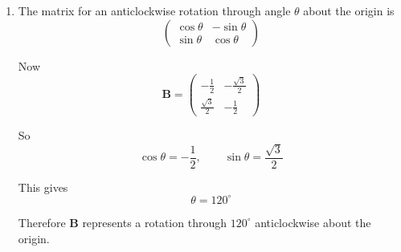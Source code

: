 \documentclass[leqno]{article}
\begin{document}
\begin{enumerate}[
  label=\textbf{\arabic*.},
  leftmargin=*,
  topsep=0pt,
  partopsep=0pt,
  parsep=0pt
]
\begin{djsSolution}
\begin{enumerate}[label=\textbf{(\roman*)}]
This gives the simultaneous equations
\begin{align*}
-\frac12x+\frac{\sqrt3}{2}y&=x\\
\frac{\sqrt3}{2}x+\frac12y&=y
\end{align*}

Multiply both equations by \(2\):
\begin{align*}
-x+\sqrt3\,y&=2x\\
\sqrt3\,x+y&=2y
\end{align*}

So
\begin{align*}
-3x+\sqrt3\,y&=0\\
\sqrt3\,x-y&=0
\end{align*}

From either equation:
\[
y=\sqrt3\,x
\]

So the mirror line is
\[
y=\sqrt3 x
\]

\item
The matrix for an anticlockwise rotation through angle \(\theta\) about the origin is
\[
\begin{pmatrix}
\cos\theta & -\sin\theta\\
\sin\theta & \cos\theta
\end{pmatrix}
\]

Now
\[
\mathbf{B}=
\begin{pmatrix}
-\frac12 & -\frac{\sqrt3}{2}\\[4pt]
\frac{\sqrt3}{2} & -\frac12
\end{pmatrix}
\]

So
\[
\cos\theta=-\frac12,\qquad \sin\theta=\frac{\sqrt3}{2}
\]

This gives
\[
\theta=120^\circ
\]

Therefore \(\mathbf{B}\) represents a rotation through \(120^\circ\) anticlockwise about the origin.


\end{enumerate}
\end{djsSolution}
\end{enumerate}
\end{document}
